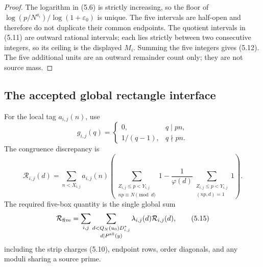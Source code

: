 \documentclass[11pt]{article}
\theoremstyle{definition}
\newcommand{\eps}{\varepsilon}
\begin{document}
\begin{proof}
The logarithm in (5.6) is strictly increasing, so the floor of
\(\log(p/N^{a_i})/\log(1+\eps_0)\) is unique.  The five intervals are
half-open and therefore do not duplicate their common endpoints.  The
quotient intervals in (5.11) are outward rational intervals; each lies
strictly between two consecutive integers, so its ceiling is the displayed
\(M_i\).  Summing the five integers gives (5.12).  The five additional
units are an outward remainder count only; they are not source mass.
\end{proof}

\subsection{The accepted global rectangle interface}
\label{sec:rectangle-interface}

For the local tag \(a_{i,j}(n)\), use
\[
 g_{i,j}(q)=
 \begin{cases}
 0,&q\mid pn,\\
 1/(q-1),&q\nmid pn.
 \end{cases}
\tag{5.13}
\]
The congruence discrepancy is
\[
\mathcal R_{i,j}(d)=
 \sum_{n<X_{i,j}}a_{i,j}(n)
 \left(
 \sum_{\substack{Z_{i,j}\le p<Y_{i,j}\\np\equiv N\pmod d}}1
 -\frac1{\varphi(d)}
 \sum_{\substack{Z_{i,j}\le p<Y_{i,j}\\(np,d)=1}}1
 \right).
\tag{5.14}
\]
The required five-box quantity is the single global sum
\[
 \mathcal R_{\rm five}=
 \sum_{i,j}\sum_{\substack{d<Q_N(u_0)D^*_{i,j}\\d\mid P^{\rm all}(y)}}
 \lambda_{i,j}(d)\mathcal R_{i,j}(d),
\tag{5.15}
\]
including the strip charges (5.10), endpoint rows, order diagonals, and any
moduli sharing a source prime.
\end{document}
